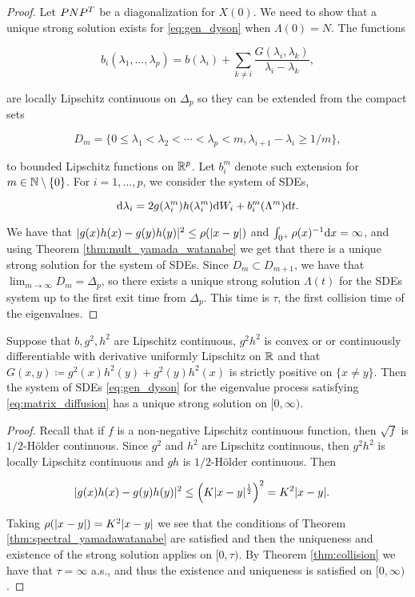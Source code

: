 \begin{proof}
    Let $PN P^T$ be a diagonalization for $X(0)$. We need to show that a unique strong solution exists for \eqref{eq:gen_dyson} when $\Lambda(0)=N$. The functions
    
    \[ b_i(\lambda_1, \dots,\lambda_p) = b(\lambda_i) + \sum_{k \neq i} \frac{G(\lambda_i,\lambda_k)}{\lambda_i - \lambda_k}, \]

    \noindent are locally Lipschitz continuous on $\Delta_p$ so they can be extended from the compact sets 

    \[ D_m = \{ 0 \le \lambda_1 < \lambda_2 < \cdots < \lambda_p < m, \lambda_{i+1} - \lambda_i \ge 1/m \}, \]

    \noindent to bounded Lipschitz functions on $\mathbb R^p$. Let $b_i^m$ denote such extension for $m \in \mathbb N \setminus \{0\}$. For $i = 1, \dots, p$, we consider the system of SDEs,

    \[ \mathrm d \lambda_i = 2g(\lambda_i^m)h(\lambda_i^m)\mathrm d W_i + b_i^m(\Lambda^m) \mathrm d t. \]

    We have that $\lvert g(x)h(x) - g(y)h(y) \rvert^2 \le \rho(\lvert x-y \rvert)$ and $\int_{0^+} \rho(x)^{-1}\mathrm d x=\infty$, and using Theorem \ref{thm:mult_yamada_watanabe} we get that there is a unique strong solution for the system of SDEs. Since $D_m \subset D_{m+1}$, we have that $\lim_{m\to\infty} D_m = \Delta_p$, so there exists a unique strong solution $\Lambda(t)$ for the SDEs system up to the first exit time from $\Delta_p$. This time is $\tau$, the first collision time of the eigenvalues.

\end{proof}

\begin{corollary}
    Suppose that $b, g^2, h^2$ are Lipschitz continuous, $g^2h^2$ is convex or or continuously differentiable with derivative uniformly Lipschitz on $\mathbb R$ and that $G(x,y) \coloneqq g^2(x)h^2(y) + g^2(y)h^2(x)$ is strictly positive on $\{x \neq y\}$. Then the system of SDEs \eqref{eq:gen_dyson} for the eigenvalue process satisfying \eqref{eq:matrix_diffusion} has a unique strong solution on $[0,\infty)$.
\end{corollary}

\begin{proof}
    Recall that if $f$ is a non-negative Lipschitz continuous function, then $\sqrt f$ is $1/2$-Hölder continuous. Since $g^2$ and $h^2$ are Lipschitz continuous, then $g^2h^2$ is locally Lipschitz continuous and $gh$ is $1/2$-Hölder continuous. Then

    \begin{align*}
        \lvert g(x)h(x) - g(y)h(y) \rvert^2 &\le \left( K\lvert x-y \rvert^{\frac12} \right)^2 = K^2 \lvert x-y \rvert.
    \end{align*}

    Taking $\rho(|x-y|) = K^2\lvert x-y \rvert$ we see that the conditions of Theorem \ref{thm:spectral_yamadawatanabe} are satisfied and then the uniqueness and existence of the strong solution applies on $[0,\tau)$. By Theorem \ref{thm:collision} we have that $\tau=\infty$ a.s., and thus the existence and uniqueness is satisfied on $[0,\infty)$.
\end{proof}



